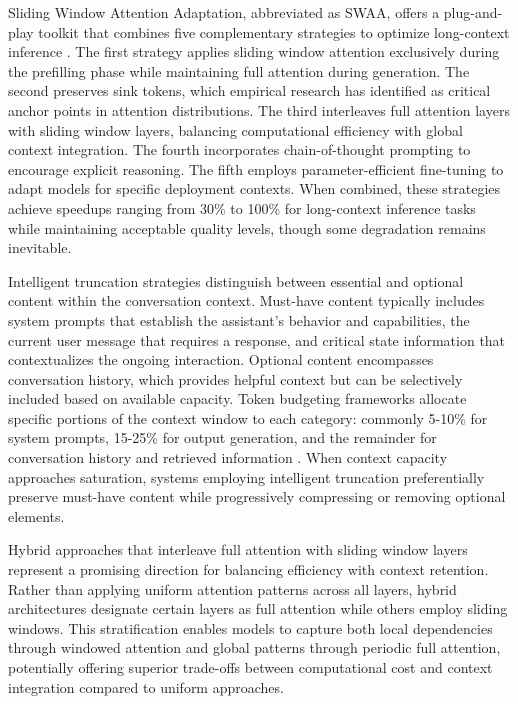 Sliding Window Attention Adaptation, abbreviated as SWAA, offers a plug-and-play toolkit that combines five complementary strategies to optimize long-context inference \citep{zhang2024swaa}. The first strategy applies sliding window attention exclusively during the prefilling phase while maintaining full attention during generation. The second preserves sink tokens, which empirical research has identified as critical anchor points in attention distributions. The third interleaves full attention layers with sliding window layers, balancing computational efficiency with global context integration. The fourth incorporates chain-of-thought prompting to encourage explicit reasoning. The fifth employs parameter-efficient fine-tuning to adapt models for specific deployment contexts. When combined, these strategies achieve speedups ranging from 30\% to 100\% for long-context inference tasks while maintaining acceptable quality levels, though some degradation remains inevitable.

Intelligent truncation strategies distinguish between essential and optional content within the conversation context. Must-have content typically includes system prompts that establish the assistant's behavior and capabilities, the current user message that requires a response, and critical state information that contextualizes the ongoing interaction. Optional content encompasses conversation history, which provides helpful context but can be selectively included based on available capacity. Token budgeting frameworks allocate specific portions of the context window to each category: commonly 5-10\% for system prompts, 15-25\% for output generation, and the remainder for conversation history and retrieved information \citep{alsalboukh2024strategies}. When context capacity approaches saturation, systems employing intelligent truncation preferentially preserve must-have content while progressively compressing or removing optional elements.

Hybrid approaches that interleave full attention with sliding window layers represent a promising direction for balancing efficiency with context retention. Rather than applying uniform attention patterns across all layers, hybrid architectures designate certain layers as full attention while others employ sliding windows. This stratification enables models to capture both local dependencies through windowed attention and global patterns through periodic full attention, potentially offering superior trade-offs between computational cost and context integration compared to uniform approaches.

